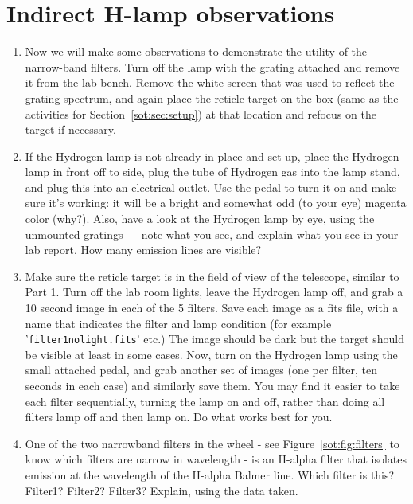 \section{Indirect H-lamp observations}\label{sot:sec:h-lamp}

\begin{enumerate}
	\item Now we will make some observations to demonstrate the utility of the narrow-band filters.
	Turn off the lamp with the grating attached and remove it from the lab bench. Remove the
	white screen that was used to reflect the grating spectrum, and again place the reticle target
	on the box (same as the activities for Section~\ref{sot:sec:setup}) at that location and refocus on the target if necessary.
	
	\item If the Hydrogen lamp is not already in place and set up, place the Hydrogen lamp in front
	off to side, plug the tube of Hydrogen gas into the lamp stand, and plug this
	into an electrical outlet. Use the pedal to turn it on and make sure it’s working: it will be
	a bright and somewhat odd (to your eye) magenta color (why?). Also, have a look at the
	Hydrogen lamp by eye, using the unmounted gratings --- note what you see, and explain what you
	see in your lab report. How many emission lines are visible?
	
	\item Make sure the reticle target is in the field of view of the telescope, similar to Part 1. Turn
	off the lab room lights, leave the Hydrogen lamp off, and grab a 10 second image in each of
	the 5 filters. Save each image as a fits file, with a name that indicates the filter and lamp
	condition (for example ’\texttt{filter1nolight.fits}’ etc.) The image should be dark but the target should
	be visible at least in some cases. Now, turn on the Hydrogen lamp using the small attached
	pedal, and grab another set of images (one per filter, ten seconds in each case) and similarly
	save them. You may find it easier to take each filter sequentially, turning the lamp on and
	off, rather than doing all filters lamp off and then lamp on. Do what works best for you.
	
	\item One of the two narrowband filters in the wheel - see Figure~\ref{sot:fig:filters} to know
	which filters are narrow in wavelength - is an H-alpha filter that isolates emission at the
	wavelength of the H-alpha Balmer line. Which filter is this? Filter1? Filter2? Filter3?
	Explain, using the data taken.
\end{enumerate}

